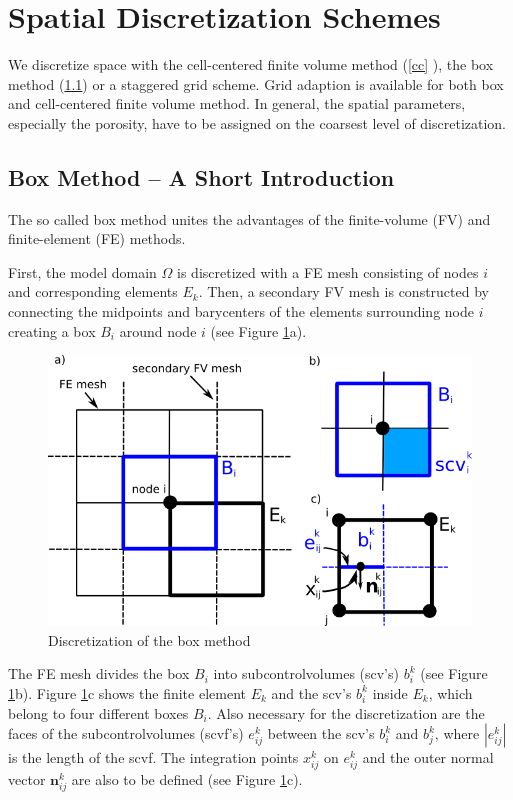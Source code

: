 \section{Spatial Discretization Schemes}
\label{spatialdiscretization}

We discretize space with the cell-centered finite volume method (\ref{cc} ), the box method (\ref{box})
or a staggered grid scheme.
Grid adaption is available for both box and cell-centered finite volume method.
In general, the spatial  parameters, especially the porosity, have to be assigned on
the coarsest level of discretization.

\subsection{Box Method -- A Short Introduction}\label{box}

The so called box method unites the advantages of the finite-volume (FV) and
finite-element (FE) methods.

First, the model domain $\Omega$ is discretized with a FE mesh consisting of nodes
$i$ and corresponding elements $E_k$. Then, a secondary FV mesh is constructed
by connecting the midpoints and barycenters of the elements surrounding node
$i$ creating a box $B_i$ around node $i$ (see Figure \ref{pc:box}a).

\begin{figure} [ht]
\includegraphics[width=0.8\linewidth,keepaspectratio]{PNG/box_disc.png}
\caption{\label{pc:box} Discretization of the box method}
\end{figure}

The FE mesh divides the box $B_i$ into subcontrolvolumes (scv's) $b^k_i$
(see Figure \ref{pc:box}b). Figure \ref{pc:box}c shows the finite element $E_k$
and the scv's $b^k_i$ inside $E_k$, which belong to four different boxes $B_i$.
Also necessary for the discretization are the faces of the subcontrolvolumes (scvf's)
$e^k_{ij}$ between the scv's $b^k_i$ and $b^k_j$, where $|e^k_{ij}|$ is the length
of the scvf. The integration points $x^k_{ij}$ on $e^k_{ij}$ and the outer normal
vector $\mathbf n^k_{ij}$ are also to be defined (see Figure \ref{pc:box}c).

